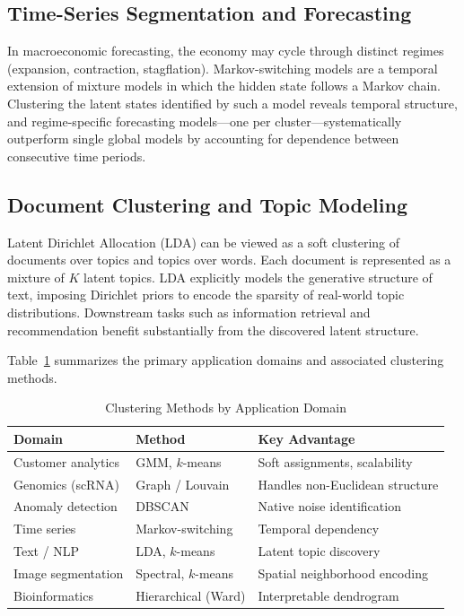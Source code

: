 \documentclass[conference]{IEEEtran}
\begin{document}
\subsection{Time-Series Segmentation and Forecasting}

In macroeconomic forecasting, the economy may cycle through distinct regimes (expansion, contraction, stagflation). Markov-switching models \cite{hamilton1989new} are a temporal extension of mixture models in which the hidden state follows a Markov chain. Clustering the latent states identified by such a model reveals temporal structure, and regime-specific forecasting models---one per cluster---systematically outperform single global models by accounting for dependence between consecutive time periods.

\subsection{Document Clustering and Topic Modeling}

Latent Dirichlet Allocation (LDA) \cite{blei2003latent} can be viewed as a soft clustering of documents over topics and topics over words. Each document is represented as a mixture of $K$ latent topics. LDA explicitly models the generative structure of text, imposing Dirichlet priors to encode the sparsity of real-world topic distributions. Downstream tasks such as information retrieval and recommendation benefit substantially from the discovered latent structure.

Table~\ref{tab:applications} summarizes the primary application domains and associated clustering methods.

\begin{table}[h]
\caption{Clustering Methods by Application Domain}
\label{tab:applications}
\centering
\renewcommand{\arraystretch}{1.3}
\begin{tabular}{p{2.3cm} p{2.3cm} p{2.8cm}}
\toprule
\textbf{Domain} & \textbf{Method} & \textbf{Key Advantage} \\
\midrule
Customer analytics & GMM, $k$-means & Soft assignments, scalability \\
Genomics (scRNA) & Graph / Louvain & Handles non-Euclidean structure \\
Anomaly detection & DBSCAN & Native noise identification \\
Time series & Markov-switching & Temporal dependency \\
Text / NLP & LDA, $k$-means & Latent topic discovery \\
Image segmentation & Spectral, $k$-means & Spatial neighborhood encoding \\
Bioinformatics & Hierarchical (Ward) & Interpretable dendrogram \\
\bottomrule
\end{tabular}
\end{table}
\end{document}
